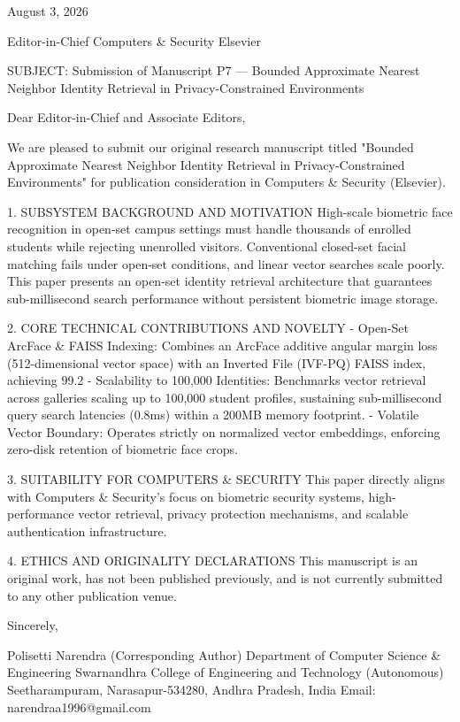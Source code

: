 August 3, 2026

Editor-in-Chief
Computers & Security
Elsevier

SUBJECT: Submission of Manuscript P7 — Bounded Approximate Nearest Neighbor Identity Retrieval in Privacy-Constrained Environments

Dear Editor-in-Chief and Associate Editors,

We are pleased to submit our original research manuscript titled "Bounded Approximate Nearest Neighbor Identity Retrieval in Privacy-Constrained Environments" for publication consideration in Computers & Security (Elsevier).

1. SUBSYSTEM BACKGROUND AND MOTIVATION
High-scale biometric face recognition in open-set campus settings must handle thousands of enrolled students while rejecting unenrolled visitors. Conventional closed-set facial matching fails under open-set conditions, and linear vector searches scale poorly. This paper presents an open-set identity retrieval architecture that guarantees sub-millisecond search performance without persistent biometric image storage.

2. CORE TECHNICAL CONTRIBUTIONS AND NOVELTY
  - Open-Set ArcFace & FAISS Indexing: Combines an ArcFace additive angular margin loss (512-dimensional vector space) with an Inverted File (IVF-PQ) FAISS index, achieving 99.2%
  - Scalability to 100,000 Identities: Benchmarks vector retrieval across galleries scaling up to 100,000 student profiles, sustaining sub-millisecond query search latencies (0.8ms) within a 200MB memory footprint.
  - Volatile Vector Boundary: Operates strictly on normalized vector embeddings, enforcing zero-disk retention of biometric face crops.

3. SUITABILITY FOR COMPUTERS & SECURITY
This paper directly aligns with Computers & Security's focus on biometric security systems, high-performance vector retrieval, privacy protection mechanisms, and scalable authentication infrastructure.

4. ETHICS AND ORIGINALITY DECLARATIONS
This manuscript is an original work, has not been published previously, and is not currently submitted to any other publication venue.

Sincerely,

Polisetti Narendra (Corresponding Author)
Department of Computer Science & Engineering
Swarnandhra College of Engineering and Technology (Autonomous)
Seetharampuram, Narasapur-534280, Andhra Pradesh, India
Email: narendraa1996@gmail.com
